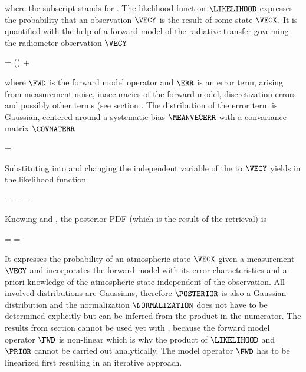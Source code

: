     where the subscript  stands for . The likelihood
    function $\LIKELIHOOD$ expresses the probability that an observation
    $\VECY$ is the result of some state $\VECX$. It is quantified with the help
    of a forward model of the radiative transfer governing the radiometer
    observation $\VECY$

    \startformula
        \VECY = \FWD(\VECX) + \ERR \EQCOMMA
    \stopformula

    where $\FWD$ is the forward model operator and $\ERR$ is an error term,
    arising from measurement noise, inaccuracies of the forward model,
    discretization errors and possibly other terms (see section
    . The distribution of the error term is Gaussian,
    centered around a systematic bias $\MEANVECERR$ with a convariance matrix
    $\COVMATERR$

    \startformula
        \PROB{\ERR} = \GAUSS{\ERR}{\MEANVECERR}{\COVMATERR} \EQSTOP
    \stopformula

    Substituting  into  and
    changing the independent variable of the {\PDF} to $\VECY$ yields in the
    likelihood function
    
    \placesubformula
    \startformula
    \startalign[n=3,align={right,middle,left}]
        \NC \PROB{\VECY - \FWD(\VECX)} = \NC
            \GAUSS{\VECY - \FWD(\VECX)}{\MEANVECERR}{\COVMATERR} \NC \NR
        \NC = \NC \GAUSS{\VECY}{\FWD(\VECX)+\MEANVECERR}{\COVMATERR} \NC
            = \LIKELIHOOD \EQSTOP {}
    \stopalign
    \stopformula

    Knowing  and , the
    posterior PDF (which is the result of the retrieval) is

    \startformula
        \POSTERIOR
        = \frac{\LIKELIHOOD \PRIOR}{\NORMALIZATION}
        = \frac{\GAUSS{\VECY}{\FWD(\VECX) + \MEANVECERR}{\COVMATERR}
            ~\GAUSS{\VECX}{\MEANVECA}{\COVMATA}}{\NORMALIZATION} \EQSTOP
    \stopformula

    It expresses the probability of an atmospheric state $\VECX$ given a
    measurement $\VECY$ and incorporates the forward model with its error
    characteristics and a-priori knowledge of the atmospheric state independent
    of the observation. All involved distributions are Gaussians, therefore
    $\POSTERIOR$ is also a Gaussian distribution and the normalization
    $\NORMALIZATION$ does not have to be determined explicitly
    but can be inferred from the product in the numerator.
    The results from section  cannot be used yet with
    , because the forward model operator $\FWD$ is
    non-linear which is why the product of $\LIKELIHOOD$ and $\PRIOR$ cannot
    be carried out analytically. 
    The model operator $\FWD$ has to be linearized first resulting in an
    iterative approach.

